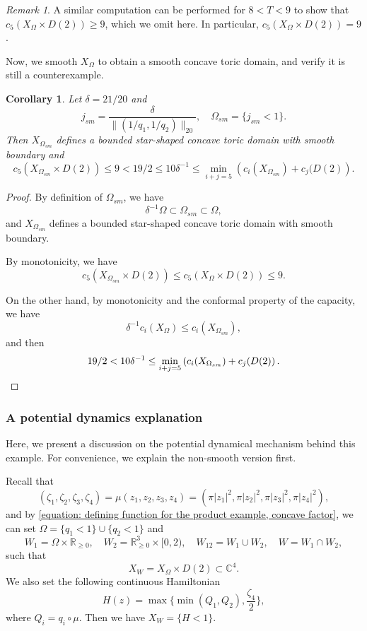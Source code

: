 \documentclass[11pt]{amsart}
\numberwithin{equation}{section}
\theoremstyle{plain}
\newtheorem{Coro}[coro]{Corollary}
\theoremstyle{definition}
\theoremstyle{remark}
\newtheorem{RMK}[rmk]{Remark}
\newcommand{\bC} { {\mathbb{C}}}
\newcommand{\bR} { {\mathbb{R}}}
\begin{document}
\begin{RMK}
    A similar computation can be performed for $8<T<9$ to show that $c_5(X_\Omega\times D(2))\geq 9$, which we omit here. In particular, $c_5(X_\Omega \times D(2)) = 9$.
\end{RMK}
Now, we smooth $X_\Omega$ to obtain a smooth concave toric domain, and verify it is still a counterexample.
\begin{Coro}\label{coro: smooth model of the product counterexample}Let $\delta=21/20$ and
    \[j_{sm}=\frac{\delta}{\|(1/q_1,1/q_2)\|_{20}},\quad \Omega_{sm}=\{j_{sm}<1\}.\]
Then $X_{\Omega_{sm}}$ defines a bounded star-shaped concave toric domain with smooth boundary and
    \[c_5(X_{\Omega_{sm}}\times D(2))\leq 9<19/2 \leq  10\delta^{-1}\leq \min_{i+j=5} \left(c_i(X_{\Omega_{sm}})+c_j(D(2)\right). \]
\end{Coro}
\begin{proof}By definition of $\Omega_{sm}$, we have
    \[{\delta}^{-1}\Omega\subset \Omega_{sm} \subset \Omega,\]
    and $X_{\Omega_{sm}}$ defines a bounded star-shaped concave toric domain with smooth boundary. 

By monotonicity, we have
\[c_5(X_{\Omega_{sm}}\times D(2))\leq c_5(X_{\Omega}\times D(2))\leq 9.\]

On the other hand, by monotonicity and the conformal property of the capacity, we have
\[\delta^{-1} c_i(X_{\Omega}) \leq c_i(X_{\Omega_{sm}}),\]
and then
\[19/2 < 10\delta^{-1}\leq \min_{i+j=5} \left(c_i(X_{\Omega_{sm}})+c_j(D(2)\right).\qedhere\]    
\end{proof}













\subsubsection{A potential dynamics explanation}\label{subsection: dynamical explanation of the example}
Here, we present a discussion on the potential dynamical mechanism behind this example. For convenience, we explain the non-smooth version first.
 

Recall that 
\begin{equation}\label{equation: toric moment map in dim 4}    (\zeta_1,\zeta_2,\zeta_3,\zeta_4)=\mu(z_1,z_2,z_3,z_4)=(\pi|z_1|^2,\pi|z_2|^2,\pi|z_3|^2,\pi|z_4|^2),
\end{equation}
and by \autoref{equation: defining function for the product example, concave factor}, we can set $\Omega=\{q_1<1\}\cup \{q_2<1\}$ and  
\[W_1=\Omega\times \bR_{\geq0},\quad W_2=\bR^3_{\geq0} \times [0,2),\quad W_{12}=W_1\cup W_2, \quad W=W_1\cap W_2,\]
such that 
\[X_{W}=X_\Omega\times D(2)\subset \bC^4.\]
We also set the following continuous Hamiltonian
\begin{equation}\label{equation: continuous Hamiltonian that defines the product counterexample}
    H(z)=\max\Big\{\min(Q_1,Q_2),\frac{\zeta_4}{2}\Big\},
\end{equation}
where $Q_i=q_i\circ \mu$. Then we have $X_W=\{H<1\}$.
\end{document}
